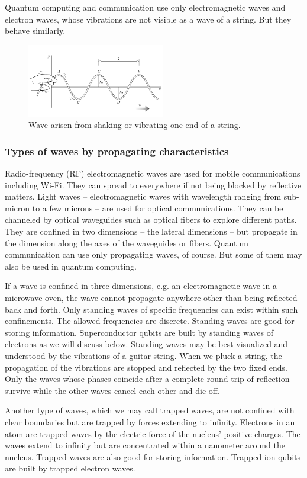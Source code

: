 \documentclass{book}
\begin{document}
Quantum computing and communication use only electromagnetic waves and electron waves, whose vibrations are not visible as a wave of a string. But they behave similarly.

\begin{figure}[ht]
\includegraphics[width=6cm]{pic/wave-in-a-string.png}
\caption{Wave arisen from shaking or vibrating one end of a string.}
\label{String}
\end{figure}

\subsubsection{Types of waves by propagating characteristics}
Radio-frequency (RF) electromagnetic waves are used for mobile communications including Wi-Fi. They can spread to everywhere if not being blocked by reflective matters. Light waves -- electromagnetic waves with wavelength ranging from sub-micron to a few microns -- are used for optical communications. They can be channeled by optical waveguides such as optical fibers to explore different paths. They are confined in two dimensions -- the lateral dimensions -- but propagate in the dimension along the axes of the waveguides or fibers. Quantum communication can use only propagating waves, of course. But some of them may also be used in quantum computing.

If a wave is confined in three dimensions, e.g. an electromagnetic wave in a microwave oven, the wave cannot propagate anywhere other than being reflected back and forth. Only standing waves of specific frequencies can exist within such confinements. The allowed frequencies are discrete. Standing waves are good for storing information. Superconductor qubits are built by standing waves of electrons as we will discuss below. Standing waves may be best visualized and understood by the vibrations of a guitar string. When we pluck a string, the propagation of the vibrations are stopped and reflected by the two fixed ends. Only the waves whose phases coincide after a complete round trip of reflection survive while the other waves cancel each other and die off.

Another type of waves, which we may call trapped waves, are not confined with clear boundaries but are trapped by forces extending to infinity. Electrons in an atom are trapped waves by the electric force of the nucleus' positive charges. The waves extend to infinity but are concentrated within a nanometer around the nucleus. Trapped waves are also good for storing information. Trapped-ion qubits are built by trapped electron waves.
\end{document}
